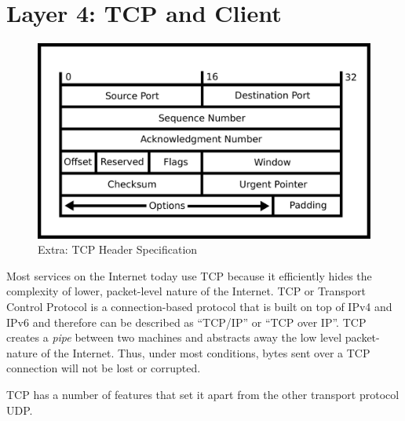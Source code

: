 \section{Layer 4: TCP and Client}


\begin{figure}[H]
  \centering
\includegraphics[width=.8\textwidth]{networking/drawings/tcp_header.eps}
\caption{Extra: TCP Header Specification}
\end{figure}

Most services on the Internet today use \gls{TCP} because it efficiently hides the complexity of lower, packet-level nature of the Internet.
TCP or Transport Control Protocol is a connection-based protocol that is built on top of IPv4 and IPv6 and therefore can be described as ``TCP/IP'' or ``TCP over IP''.
TCP creates a \emph{pipe} between two machines and abstracts away the low level packet-nature of the Internet. Thus, under most conditions, bytes sent over a TCP connection will not be lost or corrupted.

TCP has a number of features that set it apart from the other transport protocol UDP.

